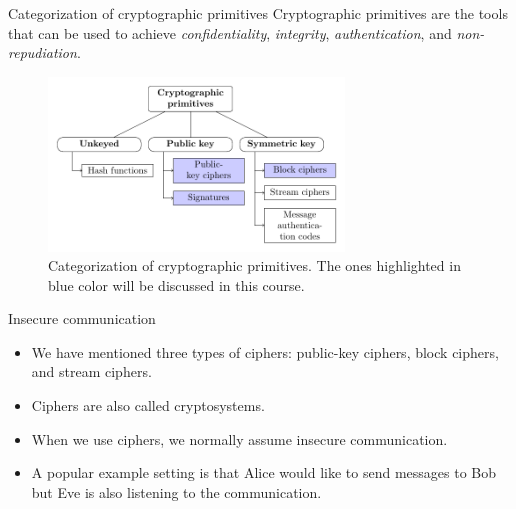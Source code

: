 \begin{frame}{Categorization of cryptographic primitives}
Cryptographic primitives are the tools that can be used to achieve \textit{confidentiality}, \textit{integrity}, \textit{authentication}, and \textit{non-repudiation}.
    \begin{figure}
        \centering
        \includegraphics[width=0.7\textwidth]{fig/primitives.pdf}
        \caption{Categorization of cryptographic primitives. The ones highlighted in blue color will be discussed in this course.}
    \end{figure}
\end{frame}

\begin{frame}{Insecure communication}
    \begin{itemize}
        \item We have mentioned three types of ciphers: public-key ciphers, block ciphers, and stream ciphers.
        \item Ciphers are also called cryptosystems.
        \item When we use ciphers, we normally assume insecure communication.
        \item A popular example setting is that Alice would like to send messages to Bob but Eve is also listening to the communication.
    \end{itemize}
\end{frame}

